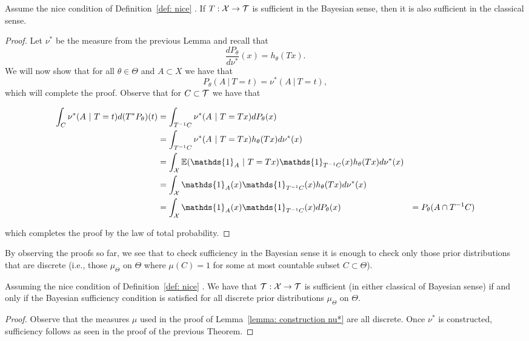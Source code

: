 \documentclass[twoside, a4paper, 10pt]{amsart}
\begin{document}
\begin{thm} Assume the nice condition of Definition~\ref{def: nice} . If $T:\mathcal{X} \to \mathcal{T}$ is sufficient in the Bayesian sense, then it is also sufficient in the classical sense.

\end{thm}

\begin{proof} Let $\nu^*$ be the measure from the previous Lemma and recall that $$\frac{dP_{\theta}}{d\nu^*}(x) = h_{\theta}(Tx).$$ We will now show that for all $\theta \in \Theta$ and $A \subset X$ we have that $$P_{\theta}(A~|~T=t) = \nu^*(A~|~T=t),$$ which will complete the proof. Observe that for $C \subset \mathcal{T}$ we have that

\begin{align*} \int_{C} \nu^*(A ~|~ T=t)d(T^*P_{\theta})(t) &= \int_{T^{-1}C} \nu^*(A~|~T=Tx)dP_{\theta}(x) \\
&= \int_{T^{-1}C} \nu^* (A~|~T=Tx) h_{\theta}(Tx) d\nu^*(x) \\
&= \int_{\cX} \bE(\mathds{1}_A ~|~ T=Tx) \mathds{1}_{T^{-1}C}(x)h_{\theta}(Tx) d\nu^*(x) \\
&= \int_{\cX} \mathds{1}_A (x) \mathds{1}_{T^{-1}C}(x)h_{\theta}(Tx) d\nu^*(x)  \\
&= \int_{\cX}  \mathds{1}_A (x) \mathds{1}_{T^{-1}C}(x) dP_{\theta}(x) 
&= P_{\theta}(A \cap T^{-1}C)\end{align*}

which completes the proof by the law of total probability.\end{proof}

By observing the proofs so far, we see that to check sufficiency in the Bayesian sense it is enough to check only those prior distributions that are discrete (i.e., those $\mu_{\Theta}$ on $\Theta$ where $\mu(C) = 1$ for some at most countable subset $C \subset \Theta$).

\begin{corol} \label{corol: sufficiency enough for discrete prior} Assuming the nice condition of Definition~\ref{def: nice} . We have that $\mathcal{T}:\mathcal{X} \to \mathcal{T}$ is sufficient (in either classical of Bayesian sense) if and only if the Bayesian sufficiency condition is satisfied for all discrete prior distributions $\mu_{\Theta}$ on $\Theta$.

\end{corol}

\begin{proof} Observe that the measures $\mu$ used in the proof of Lemma~\ref{lemma: construction nu*} are all discrete. Once $\nu^*$ is constructed, sufficiency follows as seen in the proof of the previous Theorem. \end{proof}
\end{document}
